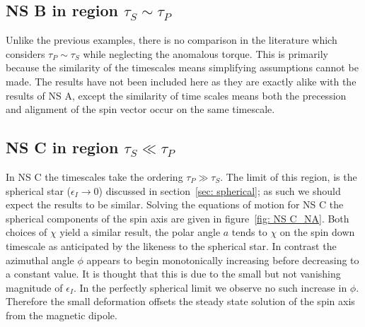 \documentclass[/home/greg/Thesis/main/main.tex]{subfiles}
\begin{document}
\FloatBarrier
\subsection{NS B in region $\tau_{S}\sim \tau_{P}$}
\label{sec: B_NA}
Unlike the previous examples, there is no comparison in the literature which
considers $\tau_{P}\sim\tau_{S}$ while neglecting the anomalous torque. This is
primarily because the similarity of the timescales means simplifying
assumptions cannot be made. The results have not been included here as they are
exactly alike with the results of NS A, except the similarity of time
scales means both the precession and alignment of the spin vector occur on the
same timescale.

\FloatBarrier
\subsection{NS C in region $\tau_{S}\ll \tau_{P}$}
\label{sec: C_NA}
In NS C the timescales take the ordering $\tau_{P}\gg \tau_{S}$. The limit of 
this region, is the spherical star
($\epsilon_{I}\rightarrow0$) discussed in section~\ref{sec: spherical}; as such
we should expect the results to be similar. Solving
the equations of motion for NS C the spherical components of the spin axis
are given in figure~\ref{fig: NS C_NA}. Both choices of $\chi$ yield a
similar result, the polar angle $a$ tends to $\chi$ on the spin down timescale
as anticipated by the likeness to the spherical star. In contrast the azimuthal
angle $\phi$ appears to begin monotonically increasing before decreasing to a
constant value. It is thought that this is due to the small but not vanishing
magnitude of $\epsilon_{I}$. In the perfectly spherical limit we observe no
such increase in $\phi$. Therefore the small
deformation offsets the steady state solution of the spin axis from the
magnetic dipole. 
\end{document}
